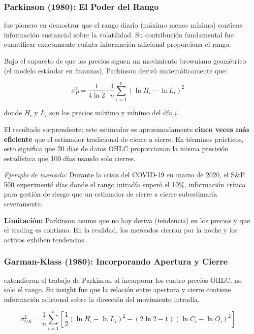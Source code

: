 \documentclass[11pt,a4paper]{article}
\begin{document}
\subsubsection{Parkinson (1980): El Poder del Rango}

\citet{parkinson1980} fue pionero en demostrar que el rango diario (máximo menos mínimo) contiene información sustancial sobre la volatilidad. Su contribución fundamental fue cuantificar exactamente cuánta información adicional proporciona el rango.

Bajo el supuesto de que los precios siguen un movimiento browniano geométrico (el modelo estándar en finanzas), Parkinson derivó matemáticamente que:

\begin{equation}
\sigma_P^2 = \frac{1}{4\ln 2} \cdot \frac{1}{n}\sum_{i=1}^{n}(\ln H_i - \ln L_i)^2
\end{equation}

donde $H_i$ y $L_i$ son los precios máximo y mínimo del día $i$.

El resultado sorprendente: este estimador es aproximadamente \textbf{cinco veces más eficiente} que el estimador tradicional de cierre a cierre. En términos prácticos, esto significa que 20 días de datos OHLC proporcionan la misma precisión estadística que 100 días usando solo cierres.

\textit{Ejemplo de mercado:} Durante la crisis del COVID-19 en marzo de 2020, el S\&P 500 experimentó días donde el rango intradía superó el 10\%, información crítica para gestión de riesgo que un estimador de cierre a cierre subestimaría severamente.

\textbf{Limitación:} Parkinson asume que no hay deriva (tendencia) en los precios y que el trading es continuo. En la realidad, los mercados cierran por la noche y los activos exhiben tendencias.

\subsubsection{Garman-Klass (1980): Incorporando Apertura y Cierre}

\citet{garman1980} extendieron el trabajo de Parkinson al incorporar los cuatro precios OHLC, no solo el rango. Su insight fue que la relación entre apertura y cierre contiene información adicional sobre la dirección del movimiento intradía.

\begin{equation}
\sigma_{GK}^2 = \frac{1}{n}\sum_{i=1}^{n}\left[\frac{1}{2}(\ln H_i - \ln L_i)^2 - (2\ln 2-1)(\ln C_i - \ln O_i)^2\right]
\end{equation}
\end{document}

